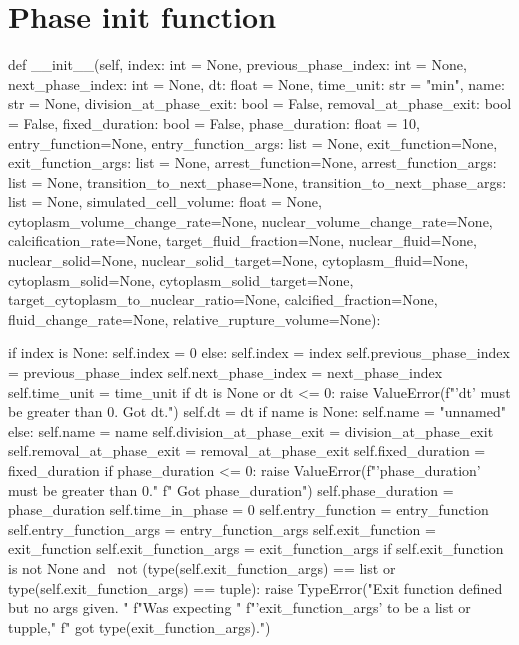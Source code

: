 \section{Phase init function}\label{suplemental:phase:init}
\begin{python}\label{code:pheno:init}
def __init__(self, index: int = None, previous_phase_index: int = None,
    next_phase_index: int = None, dt: float = None, 
    time_unit: str = "min", name: str = None, 
    division_at_phase_exit: bool = False, 
    removal_at_phase_exit: bool = False, fixed_duration: bool = False, 
    phase_duration: float = 10, entry_function=None, 
    entry_function_args: list = None,
    exit_function=None, exit_function_args: list = None, 
    arrest_function=None,
    arrest_function_args: list = None, transition_to_next_phase=None,
    transition_to_next_phase_args: list = None, 
    simulated_cell_volume: float = None, 
    cytoplasm_volume_change_rate=None,
    nuclear_volume_change_rate=None, calcification_rate=None, 
    target_fluid_fraction=None, nuclear_fluid=None, nuclear_solid=None,
    nuclear_solid_target=None, cytoplasm_fluid=None, 
    cytoplasm_solid=None, 
    cytoplasm_solid_target=None, target_cytoplasm_to_nuclear_ratio=None,
    calcified_fraction=None, fluid_change_rate=None, 
    relative_rupture_volume=None):
    
    if index is None:
        self.index = 0
    else:
        self.index = index
    self.previous_phase_index = previous_phase_index
    self.next_phase_index = next_phase_index
    self.time_unit = time_unit
    if dt is None or dt <= 0:
        raise ValueError(f"'dt' must be greater than 0. Got {dt}.")
    self.dt = dt
    if name is None:
        self.name = "unnamed"
    else:
        self.name = name
    self.division_at_phase_exit = division_at_phase_exit
    self.removal_at_phase_exit = removal_at_phase_exit  
    self.fixed_duration = fixed_duration
    if phase_duration <= 0:
        raise ValueError(f"'phase_duration' must be greater than 0."
                         f" Got {phase_duration}")
    self.phase_duration = phase_duration
    self.time_in_phase = 0
    self.entry_function = entry_function  
    self.entry_function_args = entry_function_args
    self.exit_function = exit_function
    self.exit_function_args = exit_function_args
    if self.exit_function is not None and \ 
        not (type(self.exit_function_args) == list or
             type(self.exit_function_args) == tuple):
        raise TypeError("Exit function defined but no args given. "
                        f"Was expecting "
                        f"'exit_function_args' to be a list or tupple,"
                        f" got {type(exit_function_args)}.")


\end{python}

